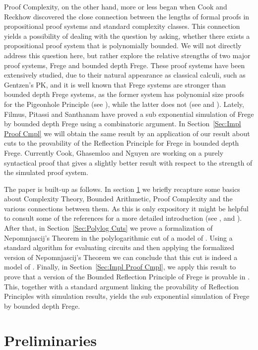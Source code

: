 \documentclass{LMCS}
\begin{document}
Proof Complexity, on the other hand, more or less began when Cook and Reckhow \cite{CR79} discovered the close
connection between the lengths of formal proofs in propositional proof systems and standard complexity classes.
This connection yields a possibility of dealing with the  question by asking, whether there
exists a propositional proof system that is polynomially bounded. We will not directly address this question
here, but rather explore the relative strengths of two major proof systems, Frege and bounded depth Frege. These
proof systems have been extensively studied, due to their natural appearance as classical calculi, such as
Gentzen's PK, and it is well known that Frege systems are stronger than bounded depth Frege systems, as the
former system has polynomial size proofs for the Pigeonhole Principle (see \cite{Bu87}), while the latter does
not (see \cite{KPW95} and \cite{PBI93}). Lately, Filmus, Pitassi and Santhanam \cite{FPS11} have proved a sub
exponential simulation of Frege by bounded depth Frege using a combinatoric argument. In Section~\ref{Sec:Impl
Proof Cmpl} we will obtain the same result by an application of our result about cuts to the provability of the
Reflection Principle for Frege in bounded depth Frege. Currently Cook, Ghasemloo and Nguyen \cite{CGN12} are
working on a purely syntactical proof that gives a slightly better result with respect to the strength of the
simulated proof system.

The paper is built-up as follows. In section \ref{Sec:Preliminaries} we briefly recapture some basics about
Complexity Theory, Bounded Arithmetic, Proof Complexity and the various connections between them. As this is
only expository it might be helpful to consult some of the references for a more detailed introduction (see
\cite{AB09}, \cite{CN10} and \cite{Kra95}). After that, in Section~\ref{Sec:Polylog Cuts} we prove a
formalization of Nepomnjascij's Theorem in the polylogarithmic cut of a model of . Using a standard
algorithm for evaluating circuits and then applying the formalized version of Nepomnjascij's Theorem we can
conclude that this cut is indeed a model of . Finally, in Section~\ref{Sec:Impl Proof Cmpl}, we apply
this result to prove that a version of the Bounded Reflection Principle of Frege is provable in . This,
together with a standard argument linking the provability of Reflection Principles with simulation results,
yields the sub exponential simulation of Frege by bounded depth Frege.


\section{Preliminaries}\label{Sec:Preliminaries}
\end{document}
